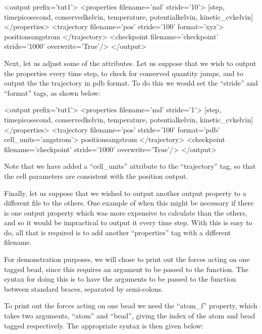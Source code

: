 \documentclass[11pt,english,fleqn]{report}
\newenvironment{code}{%
\footnotesize 
\verbatim
}{
\endverbatim
\normalsize
}
\begin{document}
\begin{code}
<output prefix='tut1'>
   <properties filename='md' stride='10'>
      [step, time{picosecond}, conserved{kelvin}, 
       temperature, potential{kelvin}, kinetic_cv{kelvin}] 
   </properties>
   <trajectory filename='pos' stride='100' format='xyz'>
      positions{angstrom} 
   </trajectory>
   <checkpoint filename='checkpoint' stride='1000' overwrite='True'/>
</output>
\end{code}

Next, let us adjust some of the attributes. Let us suppose that we
wish to output the properties every time step, to check for conserved
quantity jumps, and to output the the trajectory in pdb format.
To do this we would set the {}``stride'' and {}``format'' tags,
as shown below:

\small
\begin{code}
<output prefix='tut1'>
   <properties filename='md' stride='1'>
      [step, time{picosecond}, conserved{kelvin}, 
       temperature, potential{kelvin}, kinetic_cv{kelvin}] 
   </properties>
   <trajectory filename='pos' stride='100' format='pdb' cell_units='angstrom'>
      positions{angstrom} 
   </trajectory>
   <checkpoint filename='checkpoint' stride='1000' overwrite='True'/>
</output>
\end{code}
\normalsize

Note that we have added a {}``cell\_units'' attribute
to the {}``trajectory'' tag, so that the
cell parameters are consistent with the position output.

Finally, let us suppose that we wished to output another output property
to a different file to the others. One example of when this 
might be necessary if there
is one output property which was more expensive to calculate than the
others, and so it would be impractical to output it every time step.
With \ipi this is easy to do, all that is required is to add another
{}``properties'' tag with a different filename.

For demonstration purposes, we will chose to print out the forces
acting on one tagged bead, since this requires an argument to be
passed to the function. The \ipi syntax for doing this is to have
the arguments to be passed to the function between standard braces,
separated by semi-colons.

To print out the forces acting on one bead we need the {}``atom\_f''
property, which takes two arguments, {}``atom'' and {}``bead'',
giving the index of the atom and bead tagged respectively. The
appropriate syntax is then given below:
\end{document}
